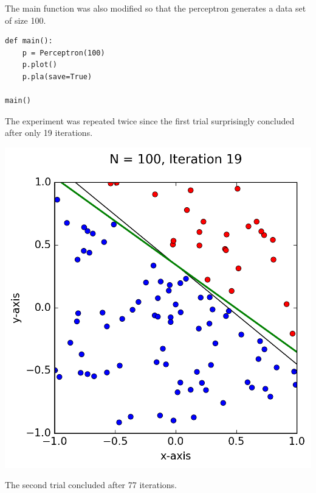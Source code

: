 \documentclass[a4paper]{article}
\begin{document}
\begin {description}
\begin{doublespace}
\begin{enumerate}[(a)]
The main function was also modified so that the perceptron generates a data set of size 100.

\begin{lstlisting}[frame=single]
def main():
    p = Perceptron(100)
    p.plot()
    p.pla(save=True)

main()
\end{lstlisting}

The experiment was repeated twice since the first trial surprisingly concluded after only 19 iterations.

\begin{center}
\includegraphics{Problem_4d1.png}
\end{center}

The second trial concluded after 77 iterations.


\end{enumerate}
\end{doublespace}
\end{description}
\end{document}
